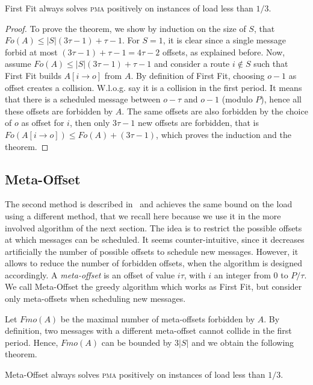 \documentclass[a4paper,UKenglish,cleveref, autoref, thm-restate]{lipics-v2019}
\newcommand\pma{\textsc{pma}\xspace}
\begin{document}
\begin{theorem}
First Fit always solves \pma positively on instances of load less than $1/3$. 
\end{theorem}
\begin{proof}
To prove the theorem, we show by induction on the size of $S$, that $Fo(A) \leq |S|(3\tau -1) + \tau -1$.  For $S = 1$, it is clear since a single message forbid at most $(3\tau -1) + \tau -1 = 4\tau-2$ offsets, as explained before. Now, assume $Fo(A) \leq |S|(3\tau -1) + \tau -1$ and consider a route $i \notin S$ such that First Fit builds $A[i \rightarrow o]$ from $A$. By definition of First Fit, choosing $o-1$ as offset creates a collision. W.l.o.g. say it is a collision in the first period. It means that there is a scheduled message between $o - \tau $ and $o-1$ (modulo $P$), hence all these offsets are forbidden by $A$. The same offsets are also forbidden by the choice of $o$ as offset for $i$, then only $3\tau -1$ new offsets are forbidden, that is $Fo(A[i \rightarrow o]) \leq Fo(A) + (3\tau -1)$, which proves the induction and the theorem.
\end{proof}


\subsection{Meta-Offset}

The second method is described  in~\cite{dominique2018deterministic} and achieves the same bound on the load using a different method, that we recall here because we use it in the more involved algorithm of the next section.
The idea is to restrict the possible offsets at which messages can be scheduled. It seems counter-intuitive, since it decreases artificially the number of possible offsets to schedule new messages. However, it allows to reduce the number of forbidden offsets, when the algorithm is designed accordingly. A \emph{meta-offset} is an offset of value $i\tau$,
with $i$ an integer from $0$ to $P / \tau$. We call Meta-Offset the greedy algorithm
which works as First Fit, but consider only meta-offsets when scheduling new messages. 

Let $Fmo(A)$ be the maximal number of meta-offsets forbidden by $A$. 
 By definition, two messages with a different meta-offset cannot collide in the first period.
Hence, $Fmo(A)$ can be bounded by $3|S|$ and we obtain the following theorem.


\begin{theorem}
Meta-Offset always solves \pma positively on instances of load less than $1/3$.
\end{theorem}
\end{document}
